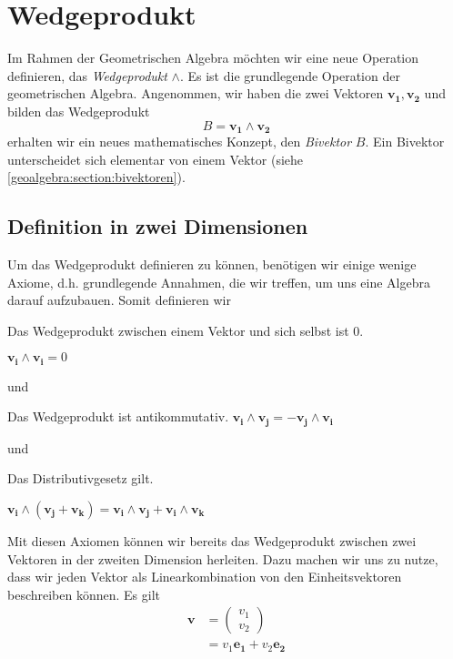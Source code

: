 
\section{Wedgeprodukt
\label{geoalgebra:section:wedgeprodukt}}

Im Rahmen der Geometrischen Algebra möchten wir eine neue Operation
definieren, das \emph{Wedgeprodukt} $\wedge$.
Es ist die grundlegende Operation der geometrischen
Algebra.
Angenommen, wir haben die
zwei Vektoren $\mathbf{v_1}, \mathbf{v_2}$ und bilden das Wedgeprodukt
\begin{equation}
  B = \mathbf{v_1} \wedge \mathbf{v_2}
\end{equation}
erhalten wir ein neues mathematisches Konzept, den \emph{Bivektor} $B$.
Ein Bivektor unterscheidet sich elementar von einem Vektor (siehe \ref{geoalgebra:section:bivektoren}).

\subsection{Definition in zwei Dimensionen}
Um das Wedgeprodukt definieren zu können, benötigen wir einige wenige Axiome, d.h. grundlegende Annahmen, die wir treffen,
um uns eine Algebra darauf aufzubauen. Somit definieren wir

\begin{satz}
  Das Wedgeprodukt zwischen einem Vektor und sich selbst ist 0.

  $
  \mathbf{v_i} \wedge \mathbf{v_i} = 0
  $
\end{satz}
und
\begin{satz}
Das Wedgeprodukt ist antikommutativ.
  $
  \mathbf{v_i} \wedge \mathbf{v_j} = -\mathbf{v_j} \wedge \mathbf{v_i}
  $
  \label{geoalgebra:satz:antikommutativ}
\end{satz}
und
\begin{satz}
Das Distributivgesetz gilt.

  $
  \mathbf{v_i} \wedge (\mathbf{v_j} + \mathbf{v_k}) = \mathbf{v_i} \wedge \mathbf{v_j} + \mathbf{v_i} \wedge \mathbf{v_k}
  $
\end{satz}

Mit diesen Axiomen können wir bereits das Wedgeprodukt zwischen zwei
Vektoren in der zweiten Dimension herleiten.
Dazu machen wir uns zu nutze, dass wir jeden Vektor als
Linearkombination von den Einheitsvektoren beschreiben können.
Es gilt
\begin{align}
  \mathbf{v} &= \begin{pmatrix} v_1 \\ v_2 \end{pmatrix} \\
    &= v_1 \mathbf{e_1} + v_2 \mathbf{e_2}
\end{align}

